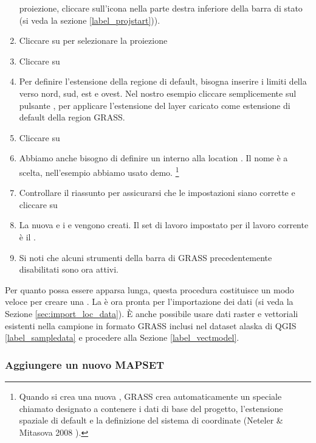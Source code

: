 \begin{enumerate}
  proiezione, cliccare sull'icona   
  nella parte destra inferiore della barra di stato (si veda la sezione \ref{label_projstart})).
  \item Cliccare su  per selezionare la proiezione
  \item Cliccare su  
  \item Per definire l'estensione della regione di default, bisogna inserire i
  limiti della  verso nord, sud, est e ovest. Nel nostro
  esempio cliccare semplicemente sul pulsante , per applicare l'estensione del layer caricato
   come estensione di default della region GRASS.
  \item Cliccare su  
  \item Abbiamo anche bisogno di definire un  interno alla
  location . Il nome è a scelta, nell'esempio abbiamo
  usato demo.
  \footnote{Quando si crea una nuova , GRASS crea
  automaticamente un  speciale chiamato 
  designato a contenere i dati di base del progetto, l'estensione spaziale di
  default e la definizione del sistema di coordinate (Neteler \& Mitasova 2008 
  \cite{neteler_mitasova08}).}
  \item Controllare il riassunto per assicurarsi che le impostazioni siano
  corrette e cliccare su  
  \item La nuova  e i 
  e  vengono creati. Il set di lavoro impostato per il
  lavoro corrente è il .
  \item Si noti che alcuni strumenti della barra di GRASS precedentemente
  disabilitati sono ora attivi.
\end{enumerate}

Per quanto possa essere apparsa lunga, questa procedura costituisce un modo
veloce per creare una . La  è ora
pronta per l'importazione dei dati (si veda la Sezione \ref{sec:import_loc_data}).
È anche possibile usare dati raster e vettoriali esistenti nella
 campione in formato GRASS inclusi nel dataset
alaska di QGIS \ref{label_sampledata} e procedere alla Sezione \ref{label_vectmodel}.

\subsubsection{Aggiungere un nuovo MAPSET}\label{sec:add_mapset}

